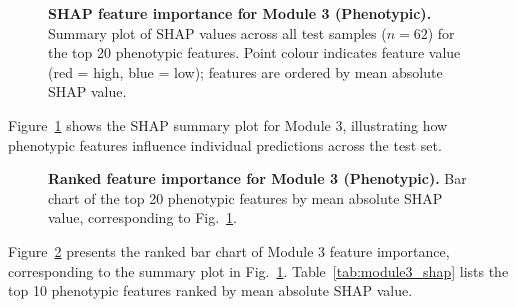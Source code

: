 \documentclass[10pt,letterpaper]{article}
\newcommand{\hlpar}[1]{\leavevmode\colorbox{yellow!30}{\parbox{\dimexpr\linewidth-2\fboxsep\relax}{#1}}\vspace{2pt}}
\begin{document}
\begin{figure}[!ht]
\caption{\textbf{SHAP feature importance for Module 3 (Phenotypic).} Summary plot of SHAP values across all test samples ($n=62$) for the top 20 phenotypic features. Point colour indicates feature value (red = high, blue = low); features are ordered by mean absolute SHAP value.}
\label{fig:module3_shap_summary}
\end{figure}

\hlpar{Figure~\ref{fig:module3_shap_summary} shows the SHAP summary plot for Module 3, illustrating how phenotypic features influence individual predictions across the test set.}
\begin{figure}[!ht]
\caption{\textbf{Ranked feature importance for Module 3 (Phenotypic).} Bar chart of the top 20 phenotypic features by mean absolute SHAP value, corresponding to Fig.~\ref{fig:module3_shap_summary}.}
\label{fig:module3_bar}
\end{figure}

\hlpar{Figure~\ref{fig:module3_bar} presents the ranked bar chart of Module 3 feature importance, corresponding to the summary plot in Fig.~\ref{fig:module3_shap_summary}. Table~\ref{tab:module3_shap} lists the top 10 phenotypic features ranked by mean absolute SHAP value.}
\end{document}
